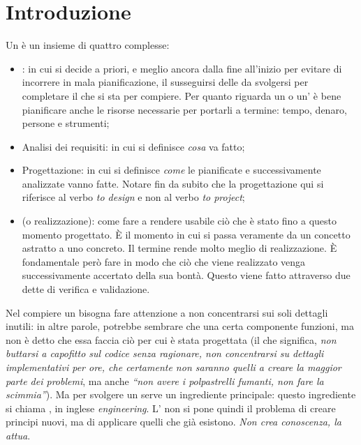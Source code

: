 \documentclass[../main.tex]{subfiles}
\begin{document}
\section{Introduzione}
Un  è un insieme di quattro  complesse:
\begin{itemize}
    \item {}:  in cui si decide a priori, e meglio ancora dalla fine all’inizio per evitare di incorrere in mala pianificazione, il susseguirsi delle  da svolgersi per completare il  che si sta per compiere. Per quanto riguarda un  o un’ è bene pianificare anche le risorse necessarie per portarli a termine: tempo, denaro, persone e strumenti;
    \item Analisi dei requisiti:  in cui si definisce \textit{cosa} va fatto;
    \item Progettazione:  in cui si definisce \textit{come} le  pianificate e successivamente analizzate vanno fatte. Notare fin da subito che la progettazione qui si riferisce al verbo \textit{to design} e non al verbo \textit{to project};
    \item {} (o realizzazione): come fare a rendere usabile ciò che è stato fino a questo momento progettato. È il momento in cui si passa veramente da un concetto astratto a uno concreto. Il termine  rende molto meglio di realizzazione. È fondamentale però fare in modo che ciò che viene realizzato venga successivamente accertato della sua bontà. Questo viene fatto attraverso due  dette di verifica e validazione.
\end{itemize}
Nel compiere un  bisogna fare attenzione a non concentrarsi sui soli dettagli inutili: in altre parole, potrebbe sembrare che una certa componente funzioni, ma non è detto che essa faccia ciò per cui è stata progettata (il che significa, \textit{non buttarsi a capofitto sul codice senza ragionare, non concentrarsi su dettagli implementativi per ore, che certamente non saranno quelli a creare la maggior parte dei problemi}, ma anche \textit{“non avere i polpastrelli fumanti, non fare la scimmia”}).\newline\newline
Ma per svolgere un  serve un ingrediente principale: questo ingrediente si chiama , in inglese \textit{engineering}. L’ non si pone quindi il problema di creare principi nuovi, ma di applicare quelli che già esistono. \textit{Non crea conoscenza, la attua}.\newline\newline
\end{document}
